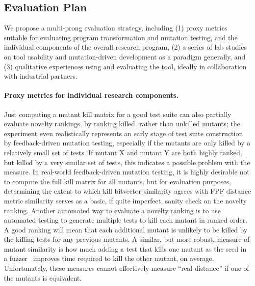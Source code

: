 
\subsection{Evaluation Plan}
\label{sec:evalplan}

We propose a multi-prong evaluation strategy, including (1) proxy metrics
suitable for evaluating program transformation and mutation testing, and the
individual components of the overall research program, (2) a series of lab
studies on tool usability and mutation-driven development as a paradigm
generally, and (3) qualitative experiences using and evaluating the tool,
ideally in collaboration with industrial partners.

\paragraph{Proxy metrics for individual research components.}
Just computing a mutant kill matrix for a good test suite can also
partially evaluate novelty rankings, by ranking
killed, rather than unkilled mutants; the experiment even
realistically represents an early stage of test suite construction by
feedback-driven mutation testing, especially if the mutants are only
killed by a relatively small set of tests.  If
mutant X and mutant Y are both highly ranked, but killed by a very
similar set of tests, this indicates a possible problem with the
measure.  In real-world feedback-driven mutation testing, it is highly
desirable not to compute the full kill matrix for all mutants, but
for evaluation purposes, determining the extent to which kill
bitvector similarity agrees with FPF distance metric similarity serves
as a basic, if quite imperfect, sanity check on the novelty ranking.
Another automated way to evaluate a novelty ranking is to use automated
testing to generate multiple tests to kill each mutant in ranked order.  A good ranking will mean
that each additional mutant is unlikely to be killed by the killing
tests for any previous mutants.  A similar, but more robust, measure of mutant similarity
is how much adding a test that kills one mutant as the seed in a
fuzzer~\cite{aflfuzz,libfuzzer} improves time required to kill the other
mutant, on average.  Unfortunately, these measures cannot effectively
measure ``real distance'' if one of the mutants is equivalent.

